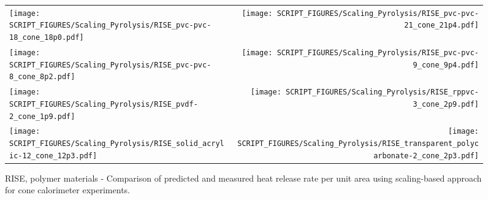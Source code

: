 \begin{figure}[p]
\begin{tabular*}{\textwidth}{l@{\extracolsep{\fill}}r}
\texttt{[image: SCRIPT\_FIGURES/Scaling\_Pyrolysis/RISE\_pvc-pvc-18\_cone\_18p0.pdf]} &
\texttt{[image: SCRIPT\_FIGURES/Scaling\_Pyrolysis/RISE\_pvc-pvc-21\_cone\_21p4.pdf]} \\
\texttt{[image: SCRIPT\_FIGURES/Scaling\_Pyrolysis/RISE\_pvc-pvc-8\_cone\_8p2.pdf]} &
\texttt{[image: SCRIPT\_FIGURES/Scaling\_Pyrolysis/RISE\_pvc-pvc-9\_cone\_9p4.pdf]} \\
\texttt{[image: SCRIPT\_FIGURES/Scaling\_Pyrolysis/RISE\_pvdf-2\_cone\_1p9.pdf]} &
\texttt{[image: SCRIPT\_FIGURES/Scaling\_Pyrolysis/RISE\_rppvc-3\_cone\_2p9.pdf]} \\
\texttt{[image: SCRIPT\_FIGURES/Scaling\_Pyrolysis/RISE\_solid\_acrylic-12\_cone\_12p3.pdf]} &
\texttt{[image: SCRIPT\_FIGURES/Scaling\_Pyrolysis/RISE\_transparent\_polycarbonate-2\_cone\_2p3.pdf]} \\
\end{tabular*}
\caption[HRRPUA of RISE Materials using scaling model, polymer materials]
{RISE, polymer materials - Comparison of predicted and measured heat release rate per unit area using scaling-based approach for cone calorimeter experiments.}
\label{RISE_Materials_HRR_Polymers2}
\end{figure}

\clearpage

